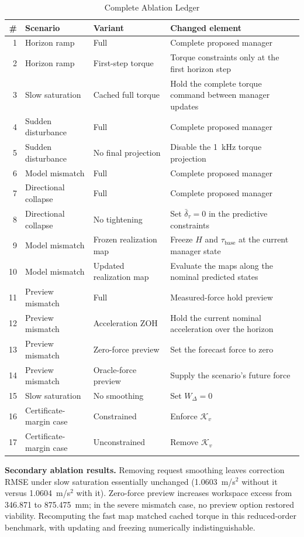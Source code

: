 \documentclass[journal]{IEEEtran}
\begin{document}
\begin{table}[t]
\caption{Complete Ablation Ledger}
\label{tab:ablations}
\centering
\footnotesize
\setlength{\tabcolsep}{3pt}
\begin{tabular}{@{}rp{1.5cm}p{1.7cm}p{2.9cm}@{}}
\toprule
\# & Scenario & Variant & Changed element \\
\midrule
1 & Horizon ramp & Full & Complete proposed manager \\
2 & Horizon ramp & First-step torque & Torque constraints only at the first horizon step \\
3 & Slow saturation & Cached full torque & Hold the complete torque command between manager updates \\
4 & Sudden disturbance & Full & Complete proposed manager \\
5 & Sudden disturbance & No final projection & Disable the 1~kHz torque projection \\
6 & Model mismatch & Full & Complete proposed manager \\
7 & Directional collapse & Full & Complete proposed manager \\
8 & Directional collapse & No tightening & Set $\bar\delta_\tau=0$ in the predictive constraints \\
9 & Model mismatch & Frozen realization map & Freeze $H$ and $\tau_{\mathrm{base}}$ at the current manager state \\
10 & Model mismatch & Updated realization map & Evaluate the maps along the nominal predicted states \\
11 & Preview mismatch & Full & Measured-force hold preview \\
12 & Preview mismatch & Acceleration ZOH & Hold the current nominal acceleration over the horizon \\
13 & Preview mismatch & Zero-force preview & Set the forecast force to zero \\
14 & Preview mismatch & Oracle-force preview & Supply the scenario's future force \\
15 & Slow saturation & No smoothing & Set $W_\Delta=0$ \\
16 & Certificate-margin case & Constrained & Enforce $\mathcal K_v$ \\
17 & Certificate-margin case & Unconstrained & Remove $\mathcal K_v$ \\
\bottomrule
\end{tabular}
\end{table}

\textbf{Secondary ablation results.} Removing request smoothing leaves correction RMSE under slow saturation essentially unchanged (1.0603~m/s$^2$ without it versus 1.0604~m/s$^2$ with it). Zero-force preview increases workspace excess from 346.871 to 875.475~mm; in the severe mismatch case, no preview option restored viability. Recomputing the fast map matched cached torque in this reduced-order benchmark, with updating and freezing numerically indistinguishable.
\end{document}
